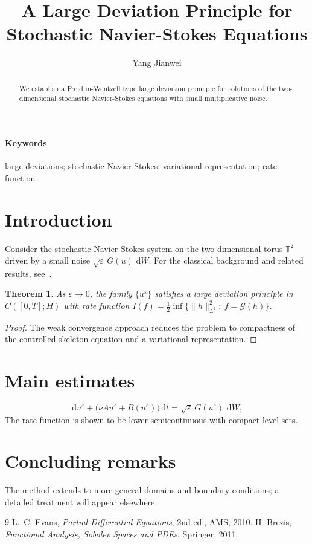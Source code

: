 \documentclass[journal,11pt]{IEEEtran}
\title{A Large Deviation Principle for Stochastic Navier-Stokes Equations}
\author{Yang Jianwei}
\date{}
\def\YTfallback{1}
\providecommand{\eps}{\varepsilon}
\newtheorem{theorem}{Theorem}[section]
\newcommand{\dd}{\,\mathrm{d}}
\begin{document}
\maketitle
\ifdefined\YTfallback
\noindent{}
\bigskip
\fi
\begin{abstract}
We establish a Freidlin-Wentzell type large deviation principle for solutions of the two-dimensional stochastic Navier-Stokes equations with small multiplicative noise.
\end{abstract}
\paragraph{Keywords} large deviations; stochastic Navier-Stokes; variational representation; rate function

\section{Introduction}
Consider the stochastic Navier-Stokes system on the two-dimensional torus $\mathbb{T}^2$ driven by a small noise $\sqrt{\eps}\,G(u)\,\dd W$.
For the classical background and related results, see~\cite{Evans,Brezis}.

\begin{theorem}
As $\eps\to0$, the family $\{u^\eps\}$ satisfies a large deviation principle in $C([0,T];H)$ with rate function $I(f)=\frac12\inf\{\|h\|_{L^2}^2:\ f=\mathcal{G}(h)\}$.
\end{theorem}

\begin{proof}
The weak convergence approach reduces the problem to compactness of the controlled skeleton equation and a variational representation.
\end{proof}

\section{Main estimates}
\begin{equation}
\dd u^\eps +\bigl(\nu A u^\eps+B(u^\eps)\bigr)\dd t =\sqrt{\eps}\,G(u^\eps)\,\dd W,
\end{equation}
The rate function is shown to be lower semicontinuous with compact level sets.

\section{Concluding remarks}
The method extends to more general domains and boundary conditions; a detailed
treatment will appear elsewhere.

\begin{thebibliography}{9}
 L.~C. Evans, \emph{Partial Differential Equations}, 2nd ed., AMS, 2010.
 H. Brezis, \emph{Functional Analysis, Sobolev Spaces and PDEs}, Springer, 2011.
\end{thebibliography}
\end{document}
